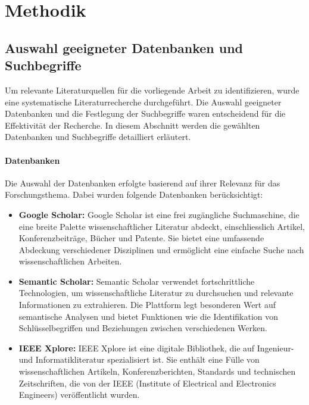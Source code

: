 \section{Methodik}

\subsection{Auswahl geeigneter Datenbanken und Suchbegriffe}

Um relevante Literaturquellen für die vorliegende Arbeit zu identifizieren, wurde eine systematische Literaturrecherche durchgeführt. Die Auswahl geeigneter Datenbanken und die Festlegung der Suchbegriffe waren entscheidend für die Effektivität der Recherche. In diesem Abschnitt werden die gewählten Datenbanken und Suchbegriffe detailliert erläutert.

\paragraph{Datenbanken}

Die Auswahl der Datenbanken erfolgte basierend auf ihrer Relevanz für das Forschungsthema. Dabei wurden folgende Datenbanken berücksichtigt:

\begin{itemize}
    \item \textbf{Google Scholar:} Google Scholar ist eine frei zugängliche Suchmaschine, die eine breite Palette wissenschaftlicher Literatur abdeckt, einschliesslich Artikel, Konferenzbeiträge, Bücher und Patente. Sie bietet eine umfassende Abdeckung verschiedener Disziplinen und ermöglicht eine einfache Suche nach wissenschaftlichen Arbeiten.

    \item \textbf{Semantic Scholar:} Semantic Scholar verwendet fortschrittliche Technologien, um wissenschaftliche Literatur zu durchsuchen und relevante Informationen zu extrahieren. Die Plattform legt besonderen Wert auf semantische Analysen und bietet Funktionen wie die Identifikation von Schlüsselbegriffen und Beziehungen zwischen verschiedenen Werken.

    \item \textbf{IEEE Xplore:} IEEE Xplore ist eine digitale Bibliothek, die auf Ingenieur- und Informatikliteratur spezialisiert ist. Sie enthält eine Fülle von wissenschaftlichen Artikeln, Konferenzberichten, Standards und technischen Zeitschriften, die von der IEEE (Institute of Electrical and Electronics Engineers) veröffentlicht wurden.
\end{itemize}

